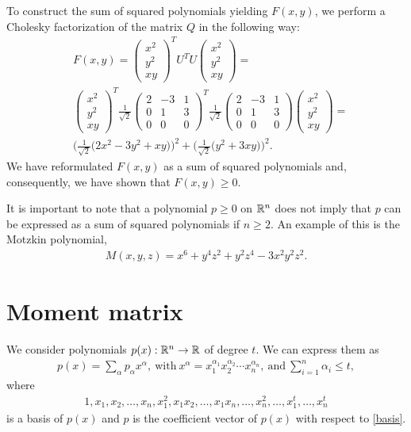 \documentclass[a4paper,twoside,justified]{tufte-handout}
\begin{document}
To construct the sum of squared polynomials yielding $F(x,y)$, we perform a Cholesky factorization of the matrix $Q$ in the following way:
\begin{align*}
&F(x,y)=\begin{pmatrix}
x^2\\
y^2\\
xy
\end{pmatrix}^T
U^TU
\begin{pmatrix}
x^2\\
y^2\\
xy
\end{pmatrix}
=\\
&\begin{pmatrix}
x^2\\
y^2\\
xy
\end{pmatrix}^T
\frac{1}{\sqrt{2}}
\begin{pmatrix}
2 & -3 & 1\\
0 & 1 & 3\\
0 & 0 & 0
\end{pmatrix}^T
\frac{1}{\sqrt{2}}
\begin{pmatrix}
2 & -3 & 1\\
0 & 1 & 3\\
0 & 0 & 0
\end{pmatrix}
\begin{pmatrix}
x^2\\
y^2\\
xy
\end{pmatrix}=\\
&\bigg(\frac{1}{\sqrt{2}}\big(2x^2-3y^2+xy\big)\bigg)^2+\bigg(\frac{1}{\sqrt{2}}\big(y^2+3xy\big)\bigg)^2.
\end{align*}
We have reformulated $F(x,y)$ as a sum of squared polynomials and, consequently, we have shown that $F(x,y)\geq0$.

It is important to note that a polynomial $p\geq 0$ on $\mathbb{R}^n$ does not imply that $p$ can be expressed as a sum of squared polynomials if $n\geq2$. An example of this is the Motzkin polynomial\cite{motzkin1967sos},
\begin{align*}
M(x,y,z)=x^6+y^4z^2+y^2z^4-3x^2y^2z^2.
\end{align*}

\section{Moment matrix\cite{lasserre2001globalOpt}}
We consider polynomials $p(x):\mathbb{R}^n\rightarrow\mathbb{R}$ of degree $t$. We can express them as
\begin{eqnarray*}
p(x)=\sum_{\alpha}p_{\alpha}x^{\alpha},\ \text{with}\   x^{\alpha}=x_1^{\alpha_1}x_2^{\alpha_2}\cdots x_n^{\alpha_n},\ \text{and}\  \sum_{i=1}^n\alpha_i\leq t,
\end{eqnarray*}
where 
\begin{align}
\label{basis}
1,x_1,x_2,\ldots,x_n,x_1^2,x_1x_2,\ldots,x_1x_n,\ldots,x_n^2,\dots,x_1^t,\ldots,x_n^t
\end{align}
is a basis of $p(x)$ and $p$ is the coefficient vector of $p(x)$ with respect to \eqref{basis}. 
\end{document}
